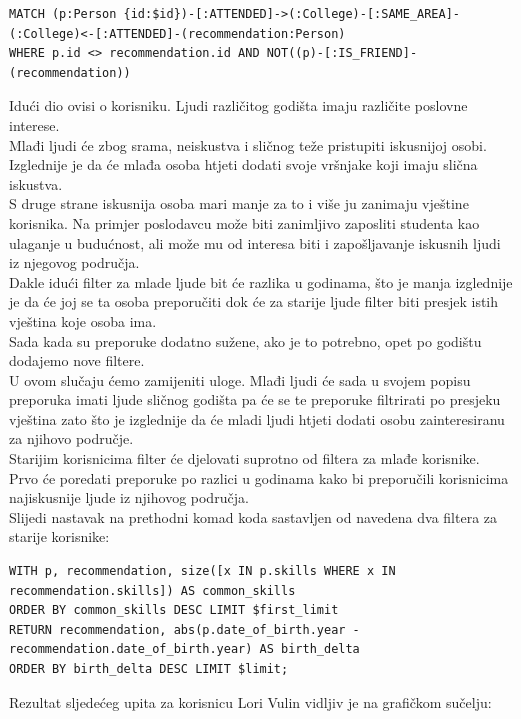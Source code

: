 \documentclass[titlepage, 12pt]{scrartcl}
\begin{document}
\begin{samepage}
\begin{verbatim}
MATCH (p:Person {id:$id})-[:ATTENDED]->(:College)-[:SAME_AREA]-
(:College)<-[:ATTENDED]-(recommendation:Person)
WHERE p.id <> recommendation.id AND NOT((p)-[:IS_FRIEND]-(recommendation))

\end{verbatim}
\end{samepage}
Idući dio ovisi o korisniku. Ljudi različitog godišta imaju različite poslovne interese. \\
Mlađi ljudi će zbog srama, neiskustva i sličnog teže pristupiti  iskusnijoj osobi. Izglednije je da će mlađa osoba htjeti dodati svoje vršnjake koji imaju slična iskustva. \\
S druge strane iskusnija osoba mari manje za to i više ju zanimaju vještine korisnika. Na primjer poslodavcu može biti zanimljivo zaposliti studenta kao ulaganje u budućnost, ali može mu od interesa biti i zapošljavanje iskusnih ljudi iz njegovog područja. \\
Dakle idući filter za mlade ljude bit će razlika u godinama, što je manja izglednije je da će joj se ta osoba preporučiti dok će za starije ljude filter biti presjek istih vještina koje osoba ima. \\
Sada kada su preporuke dodatno sužene, ako je to potrebno, opet po godištu dodajemo nove filtere. \\
U ovom slučaju ćemo zamijeniti uloge. Mlađi ljudi će sada u svojem popisu preporuka imati ljude sličnog godišta pa će se te preporuke filtrirati po presjeku vještina zato što je izglednije da će mladi ljudi htjeti dodati osobu zainteresiranu za njihovo područje. \\
Starijim korisnicima filter će djelovati suprotno od filtera za mlađe korisnike. Prvo će poredati preporuke po razlici u godinama kako bi preporučili korisnicima najiskusnije ljude iz njihovog područja. \\
Slijedi nastavak na prethodni komad koda sastavljen od navedena dva filtera za starije korisnike:
\begin{samepage}
\begin{verbatim}
WITH p, recommendation, size([x IN p.skills WHERE x IN recommendation.skills]) AS common_skills 
ORDER BY common_skills DESC LIMIT $first_limit
RETURN recommendation, abs(p.date_of_birth.year - recommendation.date_of_birth.year) AS birth_delta 
ORDER BY birth_delta DESC LIMIT $limit;

\end{verbatim}
\end{samepage}
\newpage
Rezultat sljedećeg upita za korisnicu Lori Vulin vidljiv je na grafičkom sučelju:
\end{document}
